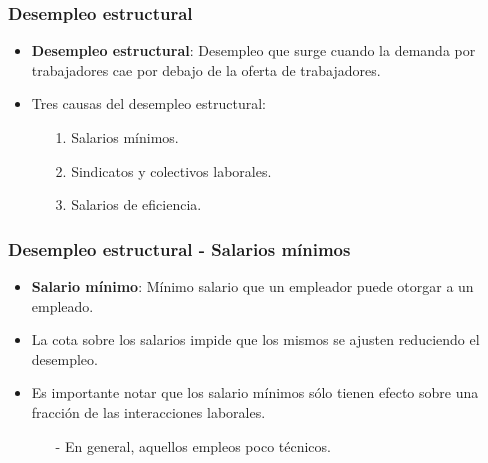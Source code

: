 \documentclass{beamer}
\begin{document}
\begin{frame}
\frametitle{Desempleo estructural}
\begin{itemize}
\setlength\itemsep{1.4em}
\item \textbf{Desempleo estructural}: Desempleo que surge cuando la demanda por trabajadores cae por debajo de la oferta de trabajadores.
\item Tres causas del desempleo estructural:\\
\begin{itemize}
\setlength\itemsep{1.0em}
\item[1.] Salarios m\'inimos.
\item[2.] Sindicatos y colectivos laborales.
\item[3.] Salarios de eficiencia.
\end{itemize}
\end{itemize}
\end{frame}

\begin{frame}
\frametitle{Desempleo estructural - Salarios m\'inimos}
\begin{itemize}
\setlength\itemsep{1.4em}
\item \textbf{Salario m\'inimo}: M\'inimo salario que un empleador puede otorgar a un empleado.
\item La cota sobre los salarios impide que los mismos se ajusten reduciendo el desempleo.
\item Es importante notar que los salario m\'inimos s\'olo tienen efecto sobre una fracci\'on de las interacciones laborales.\\
\begin{itemize}
\item[-] En general, aquellos empleos poco t\'ecnicos.
\end{itemize} 
\end{itemize}
\end{frame}
\end{document}
